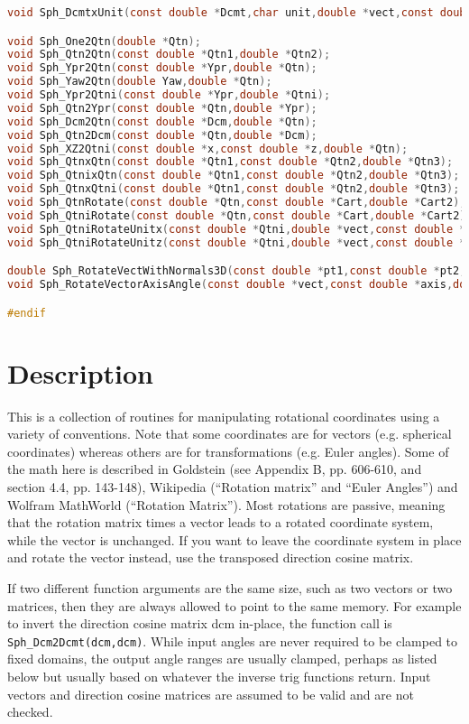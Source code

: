 \documentclass[11pt]{article}
\newcommand {\ttt} {\texttt}
\begin{document}
\begin{lstlisting}[language=C]
void Sph_DcmtxUnit(const double *Dcmt,char unit,double *vect,const double *add,double mult);

void Sph_One2Qtn(double *Qtn);
void Sph_Qtn2Qtn(const double *Qtn1,double *Qtn2);
void Sph_Ypr2Qtn(const double *Ypr,double *Qtn);
void Sph_Yaw2Qtn(double Yaw,double *Qtn);
void Sph_Ypr2Qtni(const double *Ypr,double *Qtni);
void Sph_Qtn2Ypr(const double *Qtn,double *Ypr);
void Sph_Dcm2Qtn(const double *Dcm,double *Qtn);
void Sph_Qtn2Dcm(const double *Qtn,double *Dcm);
void Sph_XZ2Qtni(const double *x,const double *z,double *Qtn);
void Sph_QtnxQtn(const double *Qtn1,const double *Qtn2,double *Qtn3);
void Sph_QtnixQtn(const double *Qtn1,const double *Qtn2,double *Qtn3);
void Sph_QtnxQtni(const double *Qtn1,const double *Qtn2,double *Qtn3);
void Sph_QtnRotate(const double *Qtn,const double *Cart,double *Cart2);
void Sph_QtniRotate(const double *Qtn,const double *Cart,double *Cart2);
void Sph_QtniRotateUnitx(const double *Qtni,double *vect,const double *add,double mult);
void Sph_QtniRotateUnitz(const double *Qtni,double *vect,const double *add,double mult);

double Sph_RotateVectWithNormals3D(const double *pt1,const double *pt2,double *newpt2,double *oldnorm,double *newnorm,int sign);
void Sph_RotateVectorAxisAngle(const double *vect,const double *axis,double angle,double *rotated);

#endif
\end{lstlisting}

\section{Description}

This is a collection of routines for manipulating rotational coordinates using a variety of conventions. Note that some coordinates are for vectors (e.g. spherical coordinates) whereas others are for transformations (e.g. Euler angles). Some of the math here is described in Goldstein (see Appendix B, pp. 606-610, and section 4.4, pp. 143-148), Wikipedia (``Rotation matrix'' and ``Euler Angles'') and Wolfram MathWorld (``Rotation Matrix''). Most rotations are passive, meaning that the rotation matrix times a vector leads to a rotated coordinate system, while the vector is unchanged. If you want to leave the coordinate system in place and rotate the vector instead, use the transposed direction cosine matrix.

If two different function arguments are the same size, such as two vectors or two matrices, then they are always allowed to point to the same memory. For example to invert the direction cosine matrix dcm in-place, the function call is \ttt{Sph\_Dcm2Dcmt(dcm,dcm)}. While input angles are never required to be clamped to fixed domains, the output angle ranges are usually clamped, perhaps as listed below but usually based on whatever the inverse trig functions return. Input vectors and direction cosine matrices are assumed to be valid and are not checked.
\end{document}
